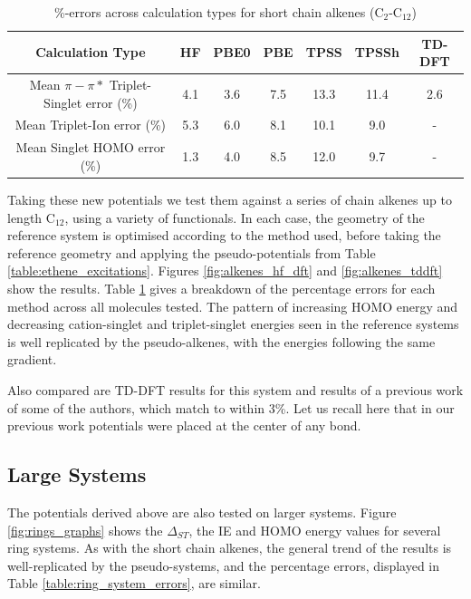 \documentclass[journal=jctcce,manuscript=article]{achemso}
\begin{document}
\begin{table}[h]
\caption{\%-errors across calculation types for short chain alkenes  (C\(_{2}\)-C\(_{12}\))}
\begin{tabular}{c c c c c c c}
\hline
Calculation Type & HF & PBE0 & PBE & TPSS & TPSSh & TD-DFT \\
\hline\hline
Mean \(\pi - \pi*\) Triplet-Singlet error (\%) & 4.1 & 3.6 & 7.5 & 13.3 & 11.4 & 2.6 \\
Mean Triplet-Ion error (\%) & 5.3 & 6.0 & 8.1 & 10.1 & 9.0 & - \\
Mean Singlet HOMO error (\%) & 1.3 & 4.0 & 8.5 & 12.0 & 9.7 & - \\
\hline
\end{tabular}
\label{table:alkene_errors}
\end{table}

Taking these new potentials we test them against a series of chain alkenes up to length C\(_{12}\), using a variety of functionals. In each case, the geometry of the reference system is optimised according to the method used, 
before taking the reference geometry and applying the pseudo-potentials from Table \ref{table:ethene_excitations}. 
Figures \ref{fig:alkenes_hf_dft} and \ref{fig:alkenes_tddft} show the results. Table \ref{table:alkene_errors} gives a breakdown of the percentage errors for each method across all molecules tested. The pattern of increasing HOMO energy and decreasing cation-singlet and triplet-singlet energies seen in the reference systems is well replicated by the pseudo-alkenes, with the energies following the same gradient.

Also compared are TD-DFT results for this system and results of a previous work of some of the authors, which match to within 3\%.\cite{drujon_pseudopotentials_2013}
Let us recall here that in our previous work potentials were placed at the center of any bond.

\subsection{Large Systems}

The potentials derived above are also tested on larger systems.
Figure \ref{fig:rings_graphs} shows the $\Delta_{ST}$, the IE and
HOMO energy values for several ring systems.
As with the short chain alkenes, the general trend of the results is well-replicated
by the pseudo-systems, and the percentage errors, displayed in Table
\ref{table:ring_system_errors}, are similar.
\end{document}

